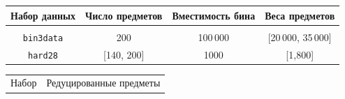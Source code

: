  \begin{table}\small %

 \begin{center}


     \label{tab:dataset}

 \vspace*{2ex}

 

 

     \begin{tabular}{|c|c|c|c|}

    \hline

      \multicolumn{1}{|c|}{Набор данных}  &Число предметов &  Вместимость бина &Веса предметов\\

       \hline

              &&&\\[-10pt]

       \texttt{bin3data} & 200 &100\,000 & [20\,000, 35\,000]\\

       \texttt{hard28}& [140, 200]& 1000 & [1,800]\\

     \hline

    \end{tabular}

    \end{center}



\begin{center}


 \label{tab:redeff}

\vspace*{2ex}






    \begin{tabular}{|c|c|c|c|}

    \hline

              Набор  &\multicolumn{3}{c|}{Редуцированные предметы}\\


\end{tabular}
\end{center}
\end{table}
